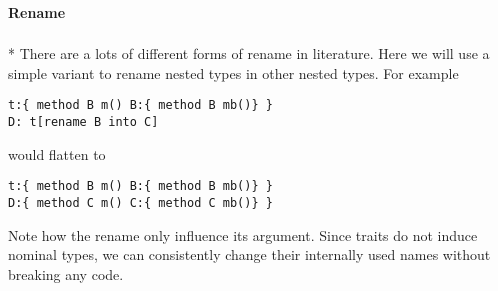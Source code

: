 \paragraph{Rename}${}_{}$\\*
There are a lots of different forms of rename in literature.
Here we will use a simple variant to rename nested types in other nested types.
For example 
\begin{lstlisting}
t:{ method B m() B:{ method B mb()} }
D: t[rename B into C]
\end{lstlisting}
would flatten to 
\begin{lstlisting}
t:{ method B m() B:{ method B mb()} }
D:{ method C m() C:{ method C mb()} }
\end{lstlisting}
Note how the rename only influence its argument.
Since traits do not induce nominal types, we can
consistently change their
internally used names without breaking any code.

%
%
% 
%



